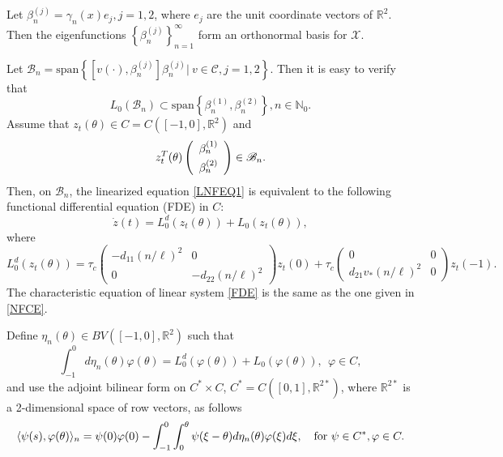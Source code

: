 \documentclass[11pt]{article}
\theoremstyle{definition}
\theoremstyle{remark}
\numberwithin{equation}{section}
\begin{document}
Let  $\beta_n^{(j)}= \gamma_n(x)e_j, j=1, 2$,
where $e_j$ are the unit coordinate vectors of $\mathbb{R}^2$. Then the eigenfunctions $\left\{\beta_n^{(j)}\right\}_{n=1}^{\infty}$  form an orthonormal basis for $\mathscr{X}$.


Let $\mathscr{B}_n=\mbox{span}\left\{\left[v(\cdot), \beta_n^{(j)}\right]\beta_n^{(j)}|~ v\in \mathscr{C}, j=1, 2\right\}$.  Then it is easy to verify that
$$L_0(\mathscr{B}_n)\subset \mbox{span}\left\{\beta_n^{(1)}, \beta_n^{(2)}\right\}, n\in \mathbb{N}_0.$$
Assume that $z_t(\theta)\in C=C\left([-1,0], \mathbb{R}^2\right)$ and
 $$z_t^T(\theta) \left(\begin{array}{c}
                             \beta_n^{(1)} \vspace{0.1cm}\\
                             \beta_n^{(2)}
                           \end{array}
\right)\in \mathscr{B}_n.$$
Then, on $\mathscr{B}_n$, the linearized equation  \eqref{LNFEQ1} is equivalent to the following  functional differential equation (FDE) in $C$:
\begin{equation}
\label{FDE}
\dot{z}(t)=L_0^d\left(z_t(\theta) \right)+ L_0(z_t(\theta)),
\end{equation}
where
$$
L_0^d\left(z_t(\theta) \right) =\tau_c\left(\begin{array}{cc}
                  -d_{11} (n/\ell)^2 & 0 \\
                   0 &   -d_{22}(n/\ell)^2
                 \end{array}
\right) z_t(0)+\tau_c\left(\begin{array}{cc}
                  0 & 0 \\
                d_{21}v_*(n/\ell)^2 &  0
                 \end{array}
\right) z_t(-1).
$$
The characteristic equation of  linear system  \eqref{FDE} is the same as the one  given in  \eqref{NFCE}.

Define $\eta_n(\theta)\in BV([-1, 0], \mathbb{R}^2)$
such that
$$
\int^0_{-1}d\eta_n(\theta) \varphi(\theta)=L_0^d(\varphi(\theta)) + L_0(\varphi(\theta)), ~~\varphi\in C,
 $$
and use the adjoint bilinear form on $C^*\times C$, $C^*=C([0, 1], \mathbb{R}^{2*})$, where $\mathbb{R}^{2*}$ is a 2-dimensional
space of row vectors,   as follows
$$
\langle\psi(s),
\varphi(\theta)\rangle_n =\psi(0)\varphi(0)-\int^0_{-1}\int^{\theta}_0
\psi(\xi-\theta)d\eta_n (\theta)\varphi(\xi)d\xi,\ \ \
\textmd{for}\ \psi\in C^*, \varphi\in C.
$$
\end{document}
